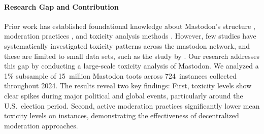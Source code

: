 \paragraph{Research Gap and Contribution}
Prior work has established foundational knowledge about Mastodon's structure \cite{zulli:2020,la_cava:2021}, moderation practices \cite{bono:2024,nicholson:2023}, and toxicity analysis methods \cite{fan:2022}. However, few studies have systematically investigated toxicity patterns across the mastodon network, and these are limited to small data sets, such as the study by \citet{al-khateeb:2022}. Our research addresses this gap by conducting a large-scale toxicity analysis of Mastodon. We analyzed a 1\% subsample of 15~million Mastodon toots across 724~instances collected throughout 2024. The results reveal two key findings: First, toxicity levels show clear spikes during major political and global events, particularly around the U.S.~election period. Second, active moderation practices significantly lower mean toxicity levels on instances, demonstrating the effectiveness of decentralized moderation approaches.

\enlargethispage{\baselineskip}